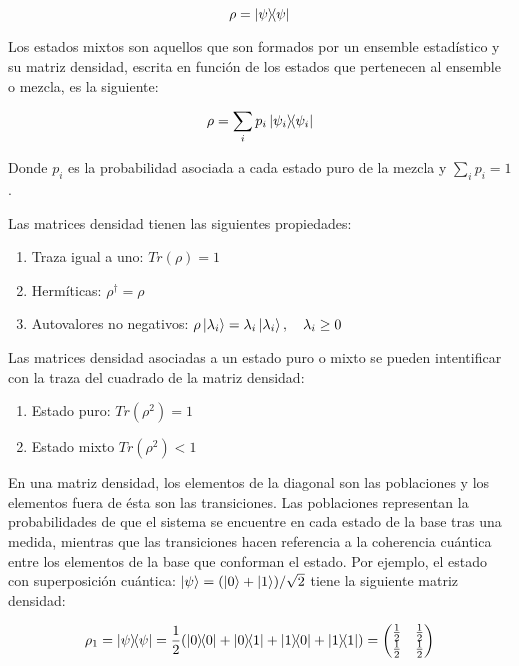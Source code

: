 \begin{equation}
    \rho = \ketbra{\psi}{\psi}
\end{equation}

Los estados mixtos son aquellos que son formados por un ensemble estadístico y su matriz densidad, escrita en función de los estados que pertenecen al ensemble o mezcla, es la siguiente:

\begin{equation}
    \rho = \sum_i p_i \ketbra{\psi_i}{\psi_i}
\end{equation}

Donde $p_i$ es la probabilidad asociada a cada estado puro de la mezcla y $\sum_i p_i = 1$.

Las matrices densidad tienen las siguientes propiedades:

\begin{enumerate}
    \item Traza igual a uno: $Tr(\rho) = 1$
    \item Hermíticas: $\rho^\dagger = \rho$
    \item Autovalores no negativos: $\rho \ket{\lambda_i} = \lambda_i \ket{\lambda_i}, \quad \lambda_i \geq 0$
\end{enumerate}

Las matrices densidad asociadas a un estado puro o mixto se pueden intentificar con la traza del cuadrado de la matriz densidad:

\begin{enumerate}
    \item Estado puro: $Tr(\rho^2) = 1$
    \item Estado mixto $Tr(\rho^2) < 1$
\end{enumerate}

En una matriz densidad, los elementos de la diagonal son las poblaciones y los elementos fuera de ésta son las transiciones. Las poblaciones representan la probabilidades de que el sistema se encuentre en cada estado de la base tras una medida, mientras que las transiciones hacen referencia a la coherencia cuántica entre los elementos de la base que conforman el estado. Por ejemplo, el estado con superposición cuántica: $\ket{\psi} = (\ket{0} + \ket{1})/\sqrt{2}$ tiene la siguiente matriz densidad:

\begin{equation}
    \rho_1 = \ketbra{\psi}{\psi} = \frac{1}{2} (\ketbra{0}{0} + \ketbra{0}{1} + \ketbra{1}{0} + \ketbra{1}{1}) =
    \begin{pmatrix}
        \frac{1}{2} & \frac{1}{2} \\
        \frac{1}{2} & \frac{1}{2}
    \end{pmatrix}
\end{equation}

